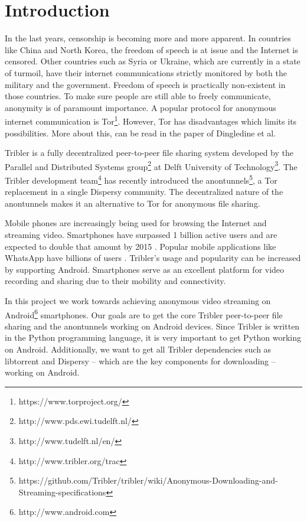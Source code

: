 \chapter{Introduction}
In the last years, censorship is becoming more and more apparent. In countries like China and North Korea, the freedom of speech is at issue and the Internet is censored. Other countries such as Syria or Ukraine, which are currently in a state of turmoil, have their internet communications strictly monitored by both the military and the government. Freedom of speech is practically non-existent in those countries. To make sure people are still able to freely communicate, anonymity is of paramount importance. A popular protocol for anonymous internet communication is Tor\footnote{https://www.torproject.org/}. However, Tor has disadvantages which limits its possibilities. More about this, can be read in the paper of Dingledine et al. \cite{dingledine2009performance}

Tribler is a fully decentralized peer-to-peer file sharing system developed by the Parallel and Distributed Systems group\footnote{http://www.pds.ewi.tudelft.nl/} at Delft University of Technology\footnote{http://www.tudelft.nl/en/}. The Tribler development team\footnote{http://www.tribler.org/trac} has recently introduced the anontunnels\footnote{https://github.com/Tribler/tribler/wiki/Anonymous-Downloading-and-Streaming-specifications}, a Tor replacement in a single Dispersy\cite{zeilemaker2013dispersy} community. The decentralized nature of the anontunnels makes it an alternative to Tor for anonymous file sharing.

Mobile phones are increasingly being used for browsing the Internet and streaming video. Smartphones have surpassed 1 billion active users and are expected to double that amount by 2015 \cite{yang2015smartphones}. Popular mobile applications like WhatsApp have billions of users \cite{googleplayinstagram, googleplaywhatsapp}. Tribler's usage and popularity can be increased by supporting Android. Smartphones serve as an excellent platform for video recording and sharing due to their mobility and connectivity.

In this project we work towards achieving anonymous video streaming on Android\footnote{http://www.android.com} smartphones. Our goals are to get the core Tribler peer-to-peer file sharing and the anontunnels working on Android devices. Since Tribler is written in the Python programming language, it is very important to get Python working on Android. Additionally, we want to get all Tribler dependencies such as libtorrent and Dispersy -- which are the key components for downloading -- working on Android.

